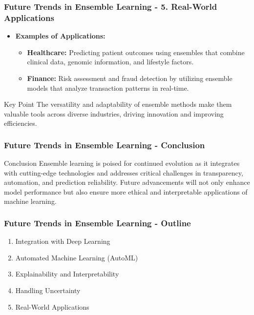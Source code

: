 \documentclass[aspectratio=169]{beamer}
\begin{document}
\begin{frame}[fragile]
    \frametitle{Future Trends in Ensemble Learning - 5. Real-World Applications}
    \begin{itemize}
        \item \textbf{Examples of Applications:}
        \begin{itemize}
            \item \textbf{Healthcare:} Predicting patient outcomes using ensembles that combine clinical data, genomic information, and lifestyle factors.
            \item \textbf{Finance:} Risk assessment and fraud detection by utilizing ensemble models that analyze transaction patterns in real-time.
        \end{itemize}
    \end{itemize}
    \begin{block}{Key Point}
        The versatility and adaptability of ensemble methods make them valuable tools across diverse industries, driving innovation and improving efficiencies.
    \end{block}
\end{frame}

\begin{frame}[fragile]
    \frametitle{Future Trends in Ensemble Learning - Conclusion}
    \begin{block}{Conclusion}
        Ensemble learning is poised for continued evolution as it integrates with cutting-edge technologies and addresses critical challenges in transparency, automation, and prediction reliability. 
        Future advancements will not only enhance model performance but also ensure more ethical and interpretable applications of machine learning.
    \end{block}
\end{frame}

\begin{frame}[fragile]
    \frametitle{Future Trends in Ensemble Learning - Outline}
    \begin{enumerate}
        \item Integration with Deep Learning
        \item Automated Machine Learning (AutoML)
        \item Explainability and Interpretability
        \item Handling Uncertainty
        \item Real-World Applications
    \end{enumerate}
\end{frame}
\end{document}
